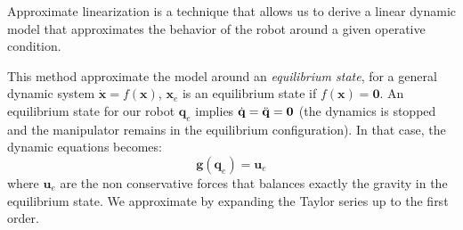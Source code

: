 \documentclass[10pt, a4paper]{report}
\newcommand{\q}{{\mathbf q}}
\begin{document}

Approximate linearization is a technique that allows us to derive a linear dynamic model that approximates  the behavior of the robot around a given operative condition.

This method approximate the model around an \textit{equilibrium state}, for a general dynamic system $\dot{\mathbf x}=f(\mathbf x)$, $\mathbf x_e$ is an equilibrium state if $f(\mathbf x)=\mathbf 0$. An equilibrium state for our robot $\q_e$ implies ${\dot{\mathbf q}}={\ddot{\mathbf q}}=\mathbf 0$ (the dynamics is stopped and the manipulator remains in the equilibrium configuration). In that case, the dynamic equations becomes:\begin{equation}
    \mathbf g(\q_e)=\mathbf u_e 
\end{equation}
where $\mathbf u_e$ are the non conservative forces that balances exactly the gravity in the equilibrium state. We approximate by expanding the Taylor series up to the first order.\bigskip 
\end{document}
